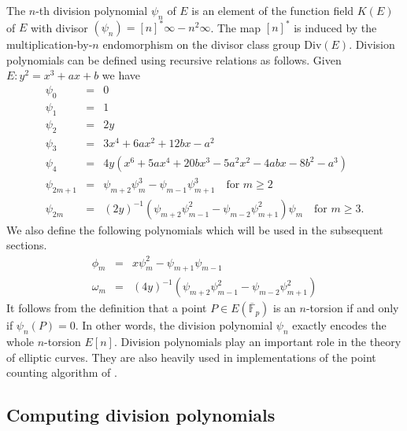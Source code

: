 \documentclass[12pt]{article}
\theoremstyle{plain}
\theoremstyle{definition}
\def\F{\ensuremath{\mathbb{F}}}
\begin{document}
The $n$-th division polynomial $\psi_n$ of $E$ is an element of the function field $K(E)$ of $E$ 
with divisor $(\psi_n) = [n]^*\infty - n^2\infty$. The map $[n]^*$ is induced by the 
multiplication-by-$n$ endomorphism on the divisor class group $\text{Div}(E)$. Division polynomials 
can be defined using recursive relations as follows. Given $E: y^2 = x^3 + ax + b$ we have
\begin{equation}
\label{equ:divpoly1}
	\begin{array}{rll}
		\psi_0 & = & 0 \\
		\psi_1 & = & 1 \\
		\psi_2 & = & 2y \\
		\psi_3 & = & 3x^4 + 6ax^2 + 12bx - a^2 \\
		\psi_4 & = & 4y(x^6 + 5ax^4 + 20bx^3 - 5a^2x^2 - 4abx - 8b^2 - a^3) \\
		\psi_{2m + 1} & = & \psi_{m + 2}\psi_m^3 - \psi_{m - 1}\psi_{m + 1}^3 \quad \text{for } m 
		\ge 2 \\
		\psi_{2m} & = & (2y)^{-1}(\psi_{m + 2}\psi_{m - 1}^2 - \psi_{m - 2}\psi_{m + 1}^2)\psi_m 
		\quad \text{for } m \ge 3.
	\end{array}
\end{equation}
We also define the following polynomials which will be used in the subsequent sections.
\begin{equation}
\label{equ:divpoly-extra}
	\begin{array}{rll}
		\phi_m & = & x\psi_m^2 - \psi_{m + 1}\psi_{m - 1} \\
		\omega_m & = & (4y)^{-1}(\psi_{m + 2}\psi_{m - 1}^2 - \psi_{m - 2}\psi_{m + 1}^2)
	\end{array}
\end{equation}
It follows from the definition that a point $P \in E(\overline{\F}_p)$ is an $n$-torsion if and 
only if $\psi_n(P) = 0$. In other words, the division polynomial $\psi_n$ exactly encodes the whole 
$n$-torsion $E[n]$. Division polynomials play an important role in the theory of elliptic 
curves. They are also heavily used in implementations of the point counting algorithm of 
\cite{schoof85}. 


\subsection{Computing division polynomials}
\end{document}
